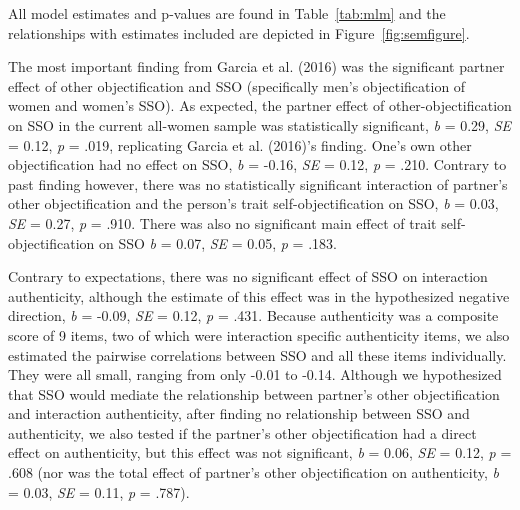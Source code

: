 \documentclass[
  man]{apa6}
\begin{document}
All model estimates and p-values are found in Table~\ref{tab:mlm} and the relationships with estimates included are depicted in Figure~\ref{fig:semfigure}.

The most important finding from Garcia et al. (2016) was the significant partner effect of other objectification and SSO (specifically men's objectification of women and women's SSO). As expected, the partner effect of other-objectification on SSO in the current all-women sample was statistically significant, \emph{b} = 0.29, \emph{SE} = 0.12, \emph{p} = .019, replicating Garcia et al. (2016)'s finding. One's own other objectification had no effect on SSO, \emph{b} = -0.16, \emph{SE} = 0.12, \emph{p} = .210. Contrary to past finding however, there was no statistically significant interaction of partner's other objectification and the person's trait self-objectification on SSO, \emph{b} = 0.03, \emph{SE} = 0.27, \emph{p} = .910. There was also no significant main effect of trait self-objectification on SSO \emph{b} = 0.07, \emph{SE} = 0.05, \emph{p} = .183.

Contrary to expectations, there was no significant effect of SSO on interaction authenticity, although the estimate of this effect was in the hypothesized negative direction, \emph{b} = -0.09, \emph{SE} = 0.12, \emph{p} = .431. Because authenticity was a composite score of 9 items, two of which were interaction specific authenticity items, we also estimated the pairwise correlations between SSO and all these items individually. They were all small, ranging from only -0.01 to -0.14. Although we hypothesized that SSO would mediate the relationship between partner's other objectification and interaction authenticity, after finding no relationship between SSO and authenticity, we also tested if the partner's other objectification had a direct effect on authenticity, but this effect was not significant, \emph{b} = 0.06, \emph{SE} = 0.12, \emph{p} = .608 (nor was the total effect of partner's other objectification on authenticity, \emph{b} = 0.03, \emph{SE} = 0.11, \emph{p} = .787).
\end{document}
